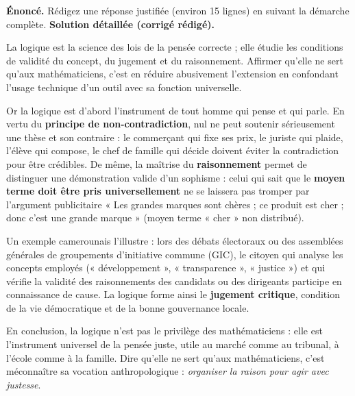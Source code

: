 \documentclass[11pt]{article}
\begin{document}
\begin{exoresolu}
\textbf{Énoncé.} Rédigez une réponse justifiée (environ 15 lignes) en suivant la démarche complète.
\tcblower
\textbf{Solution détaillée (corrigé rédigé).}

La logique est la science des lois de la pensée correcte ; elle étudie les conditions de validité du concept, du jugement et du raisonnement. Affirmer qu'elle ne sert qu'aux mathématiciens, c'est en réduire abusivement l'extension en confondant l'usage technique d'un outil avec sa fonction universelle.

Or la logique est d'abord l'instrument de tout homme qui pense et qui parle. En vertu du \textbf{principe de non-contradiction}, nul ne peut soutenir sérieusement une thèse et son contraire : le commerçant qui fixe ses prix, le juriste qui plaide, l'élève qui compose, le chef de famille qui décide doivent éviter la contradiction pour être crédibles. De même, la maîtrise du \textbf{raisonnement} permet de distinguer une démonstration valide d'un sophisme : celui qui sait que le \textbf{moyen terme doit être pris universellement} ne se laissera pas tromper par l'argument publicitaire « Les grandes marques sont chères ; ce produit est cher ; donc c'est une grande marque » (moyen terme « cher » non distribué).

Un exemple camerounais l'illustre : lors des débats électoraux ou des assemblées générales de groupements d'initiative commune (GIC), le citoyen qui analyse les concepts employés (« développement », « transparence », « justice ») et qui vérifie la validité des raisonnements des candidats ou des dirigeants participe en connaissance de cause. La logique forme ainsi le \textbf{jugement critique}, condition de la vie démocratique et de la bonne gouvernance locale.

En conclusion, la logique n'est pas le privilège des mathématiciens : elle est l'instrument universel de la pensée juste, utile au marché comme au tribunal, à l'école comme à la famille. Dire qu'elle ne sert qu'aux mathématiciens, c'est méconnaître sa vocation anthropologique : \emph{organiser la raison pour agir avec justesse}.
\end{exoresolu}
\end{document}
